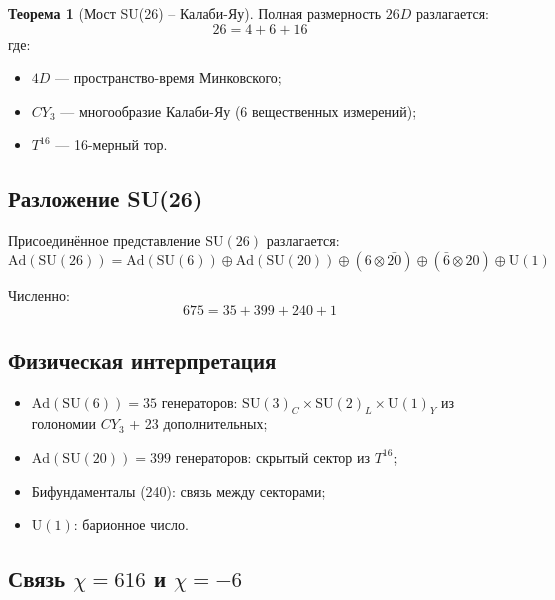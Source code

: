 \documentclass[12pt,a4paper,twoside]{article}
\newcommand{\SU}{\mathrm{SU}}
\newcommand{\Uone}{\mathrm{U}(1)}
\newcommand{\Ad}{\mathrm{Ad}}
\theoremstyle{definition}
\newtheorem{theorem}{Теорема}[section]
\begin{document}
\begin{theorem}[Мост SU(26) -- Калаби-Яу]
Полная размерность $26D$ разлагается:
\begin{equation}
\boxed{
26 = 4 + 6 + 16
}
\label{eq:compact}
\end{equation}
где:
\begin{itemize}
    \item $4D$ — пространство-время Минковского;
    \item $CY_3$ — многообразие Калаби-Яу (6 вещественных измерений);
    \item $T^{16}$ — 16-мерный тор.
\end{itemize}
\end{theorem}

\subsection{Разложение SU(26)}

Присоединённое представление $\SU(26)$ разлагается:
\begin{equation}
\Ad(\SU(26)) = \Ad(\SU(6)) \oplus \Ad(\SU(20)) \oplus (6 \otimes \bar{20}) \oplus (\bar{6} \otimes 20) \oplus \Uone
\label{eq:su26_decomp}
\end{equation}

Численно:
\begin{equation}
\boxed{
675 = 35 + 399 + 240 + 1
}
\label{eq:su26_numbers}
\end{equation}

\subsection{Физическая интерпретация}

\begin{itemize}
    \item $\Ad(\SU(6)) = 35$ генераторов: $\SU(3)_C \times \SU(2)_L \times \Uone_Y$ из голономии $CY_3$ + 23 дополнительных;
    \item $\Ad(\SU(20)) = 399$ генераторов: скрытый сектор из $T^{16}$;
    \item Бифундаменталы (240): связь между секторами;
    \item $\Uone$: барионное число.
\end{itemize}

\subsection{Связь $\chi = 616$ и $\chi = -6$}
\end{document}

